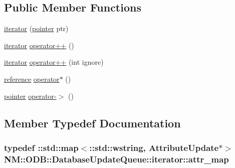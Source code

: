\subsection*{Public Member Functions}
\begin{DoxyCompactItemize}
\item 
\hyperlink{class_n_m_1_1_o_d_b_1_1_database_update_queue_1_1iterator_a7fab4fb3cd11d41030b2bb98b9bc7c79}{iterator} (\hyperlink{class_n_m_1_1_o_d_b_1_1_database_update_queue_1_1iterator_a7e0e43f97e56b1be581d21297b8b3f44}{pointer} ptr)
\item 
\hyperlink{class_n_m_1_1_o_d_b_1_1_database_update_queue_1_1iterator}{iterator} \hyperlink{class_n_m_1_1_o_d_b_1_1_database_update_queue_1_1iterator_a47ff3210b4bc1151096cdb95b2c8c8fb}{operator++} ()
\item 
\hyperlink{class_n_m_1_1_o_d_b_1_1_database_update_queue_1_1iterator}{iterator} \hyperlink{class_n_m_1_1_o_d_b_1_1_database_update_queue_1_1iterator_acf4d83570f62ac3287ec3001ebcd93c9}{operator++} (int ignore)
\item 
\hyperlink{class_n_m_1_1_o_d_b_1_1_database_update_queue_1_1iterator_a56732f54ef4ebd0af68d39345843140e}{reference} \hyperlink{class_n_m_1_1_o_d_b_1_1_database_update_queue_1_1iterator_a7387b29520d17585dda2768c071efe9b}{operator$\ast$} ()
\item 
\hyperlink{class_n_m_1_1_o_d_b_1_1_database_update_queue_1_1iterator_a7e0e43f97e56b1be581d21297b8b3f44}{pointer} \hyperlink{class_n_m_1_1_o_d_b_1_1_database_update_queue_1_1iterator_a65cbba8851b60c97bcdec86141144623}{operator-\/$>$} ()
\end{DoxyCompactItemize}


\subsection{Member Typedef Documentation}
\hypertarget{class_n_m_1_1_o_d_b_1_1_database_update_queue_1_1iterator_a6faa13ae9c82d09c665a93e670bdf834}{}
\subsubsection[{attr\+\_\+map}]{\setlength{\rightskip}{0pt plus 5cm}typedef \+::std\+::map$<$\+::std\+::wstring, {\bf Attribute\+Update}$\ast$$>$ {\bf N\+M\+::\+O\+D\+B\+::\+Database\+Update\+Queue\+::iterator\+::attr\+\_\+map}}\label{class_n_m_1_1_o_d_b_1_1_database_update_queue_1_1iterator_a6faa13ae9c82d09c665a93e670bdf834}
\hypertarget{class_n_m_1_1_o_d_b_1_1_database_update_queue_1_1iterator_ae438f0fd65eabcca2f4f006a459a2665}{}
